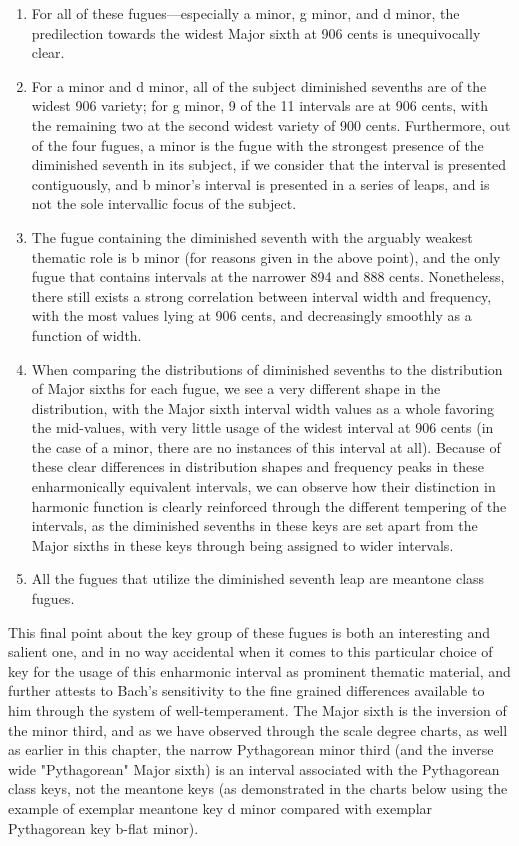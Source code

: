 \begin{enumerate}
\def\labelenumi{\arabic{enumi}.}
\tightlist
\item
  For all of these fugues---especially a minor, g minor, and d
  minor, the predilection towards the widest Major sixth at 906 cents is
  unequivocally clear.
\item
  For a minor and d minor, all of the subject diminished sevenths are of
  the widest 906 variety; for g minor, 9 of the 11 intervals are at 906
  cents, with the remaining two at the second widest variety of 900
  cents. Furthermore, out of the four fugues, a minor is the fugue with
  the strongest presence of the diminished seventh in its subject, if we
  consider that the interval is presented contiguously, and b minor's
  interval is presented in a series of leaps, and is not the sole
  intervallic focus of the subject.
\item
  The fugue containing the diminished seventh with the arguably weakest
  thematic role is b minor (for reasons given in the above point), and
  the only fugue that contains intervals at the narrower 894 and 888
  cents. Nonetheless, there still exists a strong correlation between
  interval width and frequency, with the most values lying at 906 cents,
  and decreasingly smoothly as a function of width.
\item
  When comparing the distributions of diminished sevenths to the
  distribution of Major sixths for each fugue, we see a very different
  shape in the distribution, with the Major sixth interval width values
  as a whole favoring the mid-values, with very little usage of the
  widest interval at 906 cents (in the case of a minor, there are no
  instances of this interval at all). Because of these clear differences
  in distribution shapes and frequency peaks in these enharmonically
  equivalent intervals, we can observe how their distinction in harmonic
  function is clearly reinforced through the different tempering of the
  intervals, as the diminished sevenths in these keys are set apart from
  the Major sixths in these keys through being assigned to wider
  intervals.
\item
  All the fugues that utilize the diminished seventh leap are meantone
  class fugues.
\end{enumerate}

This final point about the key group of these fugues is both an
interesting and salient one, and in no way accidental when it comes to
this particular choice of key for the usage of this enharmonic interval
as prominent thematic material, and further attests to Bach's
sensitivity to the fine grained differences available to him through the
system of well-temperament. The Major sixth is the inversion of the
minor third, and as we have observed through the scale degree charts, as
well as earlier in this chapter, the narrow Pythagorean minor third (and
the inverse wide "Pythagorean" Major sixth) is an interval associated
with the Pythagorean class keys, not the meantone keys (as demonstrated
in the charts below using the example of exemplar meantone key d minor
compared with exemplar Pythagorean key b-flat minor).


